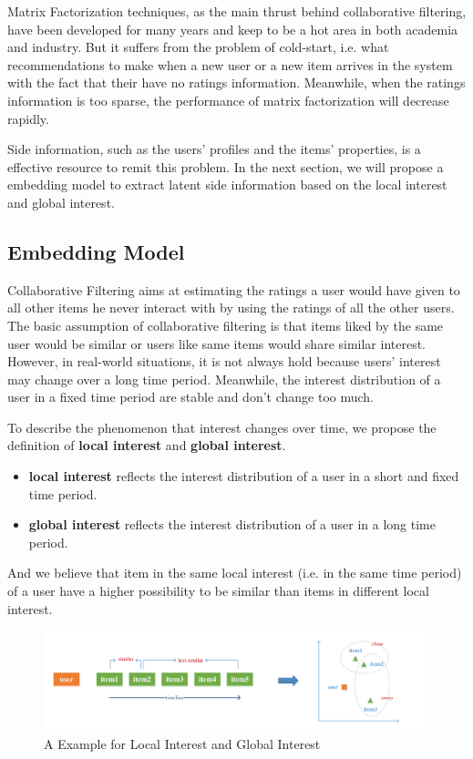 \documentclass{sig-alternate-05-2015}
\begin{document}
Matrix Factorization techniques, as the main thrust behind collaborative filtering,
have been developed for many years and keep to be a hot area in both academia and industry.
But it suffers from the problem of cold-start,
i.e. what recommendations to make when a new user or a new item arrives in the system
with the fact that their have no ratings information.
Meanwhile, when the ratings information is too sparse,
the performance of matrix factorization will decrease rapidly.

Side information, such as the users' profiles and the items' properties,
is a effective resource to remit this problem.
In the next section, we will propose a embedding model
to extract latent side information based on the local interest and global interest.

\subsection{Embedding Model}
Collaborative Filtering aims at estimating the ratings
a user would have given to all other items he never interact with
by using the ratings of all the other users.
The basic assumption of collaborative filtering is that
items liked by the same user would be similar
or users like same items would share similar interest.
However, in real-world situations,
it is not always hold because users' interest may change over
a long time period.
Meanwhile, the interest distribution of a user in a fixed time period
are stable and don't change too much.

To describe the phenomenon that interest changes over time,
we propose the definition of \textbf{local interest} and \textbf{global interest}.

\begin{itemize}
\item \textbf{local interest} reflects the interest distribution of a user
in a short and fixed time period.
\item \textbf{global interest} reflects the interest distribution of a user
in a long time period.
\end{itemize}

And we believe that item in the same local interest (i.e. in the same time period)
of a user have a higher possibility to be similar than
items in different local interest.

\begin{figure}[htbp]
	\centering
	\includegraphics[scale=0.6]{images/1.pdf}
	\caption{A Example for Local Interest and Global Interest}
	\label{fig:example}
\end{figure}
\end{document}
